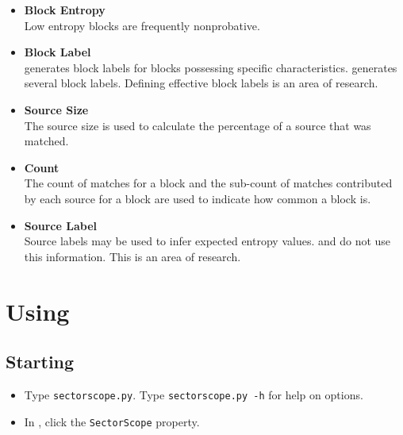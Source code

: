 \documentclass[11pt,fleqn]{article} %
\begin{document}
\begin{itemize}
\item \textbf{Block Entropy}\\
Low entropy blocks are frequently nonprobative.
\item \textbf{Block Label}\\
\hdb generates block labels for blocks possessing specific characteristics. \hdb generates several block labels. Defining effective block labels is an area of research.
\item \textbf{Source Size}\\
The source size is used to calculate the percentage of a source that was matched.
\item \textbf{Count}\\
The count of matches for a block and the sub-count of matches contributed by each source for a block are used to indicate how common a block is.
\item \textbf{Source Label}\\
Source labels may be used to infer expected entropy values. \hdb and \sscope do not use this information. This is an area of research.
\end{itemize}

\section{Using \sscope}
\subsection{Starting \sscope}
\begin{itemize}
\item Type \verb+sectorscope.py+. Type \verb+sectorscope.py -h+ for help on options.
\item In \aut, click the \verb+SectorScope+ property.
\end{itemize}
\end{document}
